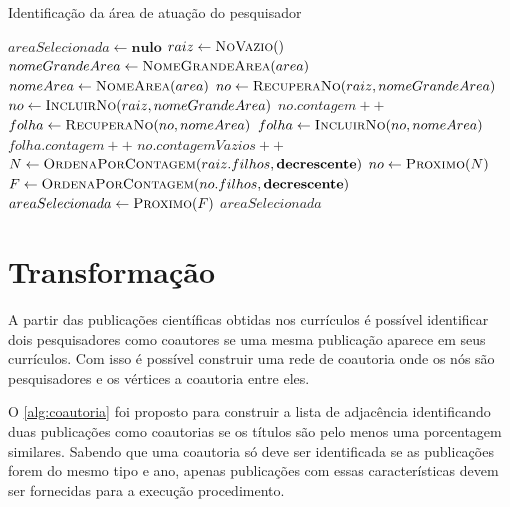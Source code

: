 \begin{algorithm}
\caption{Identificação da área de atuação do pesquisador}
\label{alg:identificacaoarea}
\begin{algorithmic}[1]
    \State $areaSelecionada \gets \textbf{nulo}$
    \State $raiz \gets \Call{NoVazio}$
        \State $nomeGrandeArea \gets \Call{NomeGrandeArea}{area}$
        \State $nomeArea \gets \Call{NomeArea}{area}$
        \State $no \gets \Call{RecuperaNo}{raiz, nomeGrandeArea}$
            \State $no \gets \Call{IncluirNo}{raiz, nomeGrandeArea}$
        \EndIf
        \State $no.contagem++$
            \State $folha \gets \Call{RecuperaNo}{no, nomeArea}$
                \State $folha \gets \Call{IncluirNo}{no, nomeArea}$
            \EndIf
            \State $folha.contagem++$
        \Else
            \State $no.contagemVazios++$
        \EndIf
    \EndFor
    \State $N \gets \Call{OrdenaPorContagem}{raiz.filhos, \textbf{decrescente}}$
        \State $no \gets \Call{Proximo}{N}$
            \State $F \gets \Call{OrdenaPorContagem}{no.filhos, \textbf{decrescente}}$
            \State $areaSelecionada \gets \Call{Proximo}{F}$
        \EndIf
    \EndWhile
    \State \Return $areaSelecionada$
\EndProcedure
\end{algorithmic}
\end{algorithm}

\section{Transformação}

A partir das publicações científicas obtidas nos currículos é possível identificar dois pesquisadores como coautores se uma mesma publicação aparece em seus currículos. Com isso é possível construir uma rede de coautoria onde os nós são pesquisadores e os vértices a coautoria entre eles.

O \autoref{alg:coautoria} foi proposto para construir a lista de adjacência identificando duas publicações como coautorias se os títulos são pelo menos uma porcentagem similares. Sabendo que uma coautoria só deve ser identificada se as publicações forem do mesmo tipo e ano, apenas publicações com essas características devem ser fornecidas para a execução procedimento.

